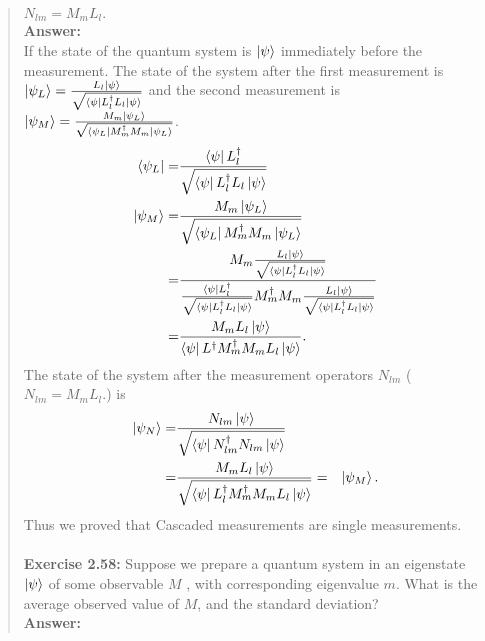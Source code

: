 \documentclass[UTF8]{ctexart}
\begin{document}
\begin{quote}
   $N_{lm} = M_{m}L_{l}.$
\\
	\textbf{Answer:}\\
	If the state of the quantum system is $\ket{\psi}$ immediately before the measurement. 
    The state of the system after the first measurement is 
	$\ket{\psi_{L}}=\frac{L_{l}\ket{\psi}}{\sqrt{\bra{\psi}L_{l}^{\dagger}L_{l}\ket{\psi}}}$ 
	and the second measurement is
	$\ket{\psi_{M}}=\frac{M_{m}\ket{\psi_{L}}}{\sqrt{\bra{\psi_{L}}M_{m}^{\dagger}M_{m}\ket{\psi_{L}}}}$.
		\begin{equation}
			\begin{aligned}
				\bra{\psi_{L}}=&\frac{\bra{\psi} L_{l}^{\dagger}}{\sqrt{\bra{\psi}L_{l}^{\dagger}L_{l}\ket{\psi}}}\\
				\ket{\psi_{M}}=&\frac{M_{m}\ket{\psi_{L}}}{\sqrt{\bra{\psi_{L}}M_{m}^{\dagger}M_{m}\ket{\psi_{L}}}} \\
						  =&\frac{M_{m}\frac{L_{l}\ket{\psi}}{\sqrt{\bra{\psi}L_{l}^{\dagger}L_{l}\ket{\psi}}}}
						  {\frac{\bra{\psi} L_{l}^{\dagger}}{\sqrt{\bra{\psi}L_{l}^{\dagger}L_{l}\ket{\psi}}}
						  M_{m}^{\dagger}M_{m}
						  \frac{L_{l}\ket{\psi}}{\sqrt{\bra{\psi}L_{l}^{\dagger}L_{l}\ket{\psi}}}
						  } \\
						  =&\frac{M_{m}L_{l}\ket{\psi}}{\bra{\psi}L^{\dagger}M_{m}^{\dagger}M_{m}L_{l}\ket{\psi}}.\\
			\end{aligned}
		\end{equation}
		The state of the system after the measurement operators ${N_{lm}}$ ($N_{lm} = M_{m}L_{l}.$) is
		\begin{equation}
			\begin{aligned}
				\ket{\psi_{N}}=&\frac{N_{lm}\ket{\psi}}{\sqrt{\bra{\psi}N_{lm}^{\dagger}N_{lm}\ket{\psi}}} \\
							  =&\frac{M_{m}L_{l}\ket{\psi}}{\sqrt{\bra{\psi}L_{l}^{\dagger}M_{m}^{\dagger}M_{m}L_{l}\ket{\psi}}}
							  =&\ket{\psi_{M}}.
			\end{aligned}
		\end{equation} 
		Thus we proved that Cascaded measurements are single measurements.
	\\
\\
\textbf{Exercise 2.58: } Suppose we prepare a quantum system in an eigenstate
 $ \ket{\psi}$ of some observable $M$ , with corresponding eigenvalue $m$. 
 What is the average observed value of $M$, and the standard deviation?
 \\
\textbf{Answer:}\\

\end{quote}
\end{document}
